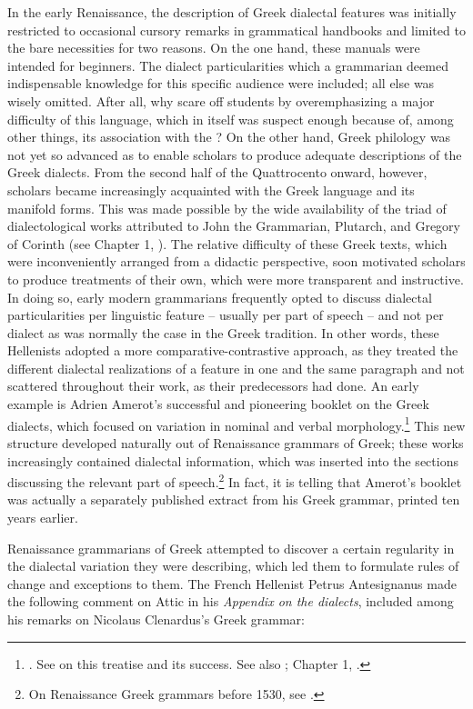 In the early Renaissance, the description of Greek dialectal features was initially restricted to occasional cursory remarks in grammatical handbooks and limited to the bare necessities for two reasons. On the one hand, these manuals were intended for beginners. The dialect particularities which a grammarian deemed indispensable knowledge for this specific audience were included; all else was wisely omitted. After all, why scare off students by overemphasizing a major difficulty of this language, which in itself was suspect enough because of, among other things, its association with the ? On the other hand, Greek philology was not yet so advanced as to enable scholars to produce adequate descriptions of the Greek dialects. From the second half of the Quattrocento onward, however, scholars became increasingly acquainted with the Greek language and its manifold forms. This was made possible by the wide availability of the triad of dialectological works attributed to John the Grammarian, Plutarch, and Gregory of Corinth (see Chapter 1, ). The relative difficulty of these Greek texts, which were inconveniently arranged from a didactic perspective, soon motivated scholars to produce treatments of their own, which were more transparent and instructive. In doing so, early modern grammarians frequently opted to discuss dialectal particularities per linguistic feature – usually per part of speech – and not per dialect as was normally the case in the Greek tradition. In other words, these Hellenists adopted a more comparative-contrastive approach, as they treated the different dialectal realizations of a feature in one and the same paragraph and not scattered throughout their work, as their predecessors had done. An early example is Adrien Amerot’s successful and pioneering booklet on the Greek dialects, which focused on variation in nominal and verbal morphology.\footnote{{\citet{Amerot1530}. See \citet[1--19]{Hoven1985} on this treatise and its success. See also \citet{Hummel1999}; Chapter 1, .}} This new structure developed naturally out of Renaissance grammars of Greek; these works increasingly contained dialectal information, which was inserted into the sections discussing the relevant part of speech.\footnote{{On Renaissance Greek grammars before 1530, see \citet{Botley2010}.}} In fact, it is telling that Amerot’s booklet was actually a separately published extract from his Greek grammar, printed ten years earlier.

Renaissance grammarians of Greek attempted to discover a certain regularity in the dialectal variation they were describing, which led them to formulate rules of change and exceptions to them. The French Hellenist Petrus Antesignanus made the following comment on Attic in his \textit{Appendix on the dialects}, included among his remarks on Nicolaus Clenardus’s Greek grammar:

